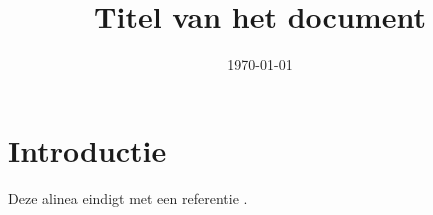 \documentclass{uva-inf-article}
\title{Titel van het document}
\date{\today}
\begin{document}
\maketitle
\newpage


\section{Introductie}

\lipsum[1][1-3]  
Deze alinea eindigt met een referentie \parencite{vanwijk21}.

\lipsum[2-3]


\newpage
\printbibliography

\end{document}
